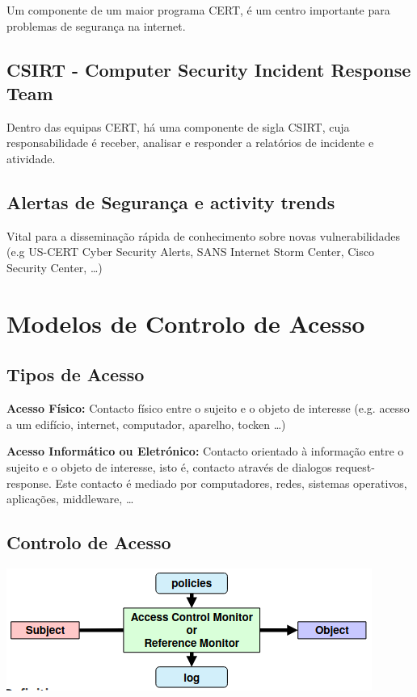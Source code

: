 \documentclass{article}
\begin{document}
Um componente de um maior programa CERT, é um centro importante
para problemas de segurança na internet.

\subsection{CSIRT - Computer Security Incident Response Team}

Dentro das equipas CERT, há uma componente de sigla CSIRT, cuja responsabilidade é
receber, analisar e responder a relatórios de incidente e atividade.

\subsection{Alertas de Segurança e activity trends}

Vital para a disseminação rápida de conhecimento sobre novas vulnerabilidades
(e.g US-CERT Cyber Security Alerts, SANS Internet Storm Center, Cisco Security Center, \dots)

\pagebreak

\section{Modelos de Controlo de Acesso}

\subsection{Tipos de Acesso}

\begin{flushleft}
  \textbf{Acesso Físico:} Contacto físico entre o sujeito e o objeto de interesse
  (e.g. acesso a um edifício, internet, computador, aparelho, tocken \dots)

  \textbf{Acesso Informático ou Eletrónico:} Contacto orientado à informação entre
  o sujeito e o objeto de interesse, isto é, contacto através de dialogos
  request-response. Este contacto é mediado por computadores, redes,
  sistemas operativos, aplicações, middleware, \dots
\end{flushleft}

\subsection{Controlo de Acesso}

\begin{center}
  \includegraphics[scale=0.4]{13}
\end{center}
\end{document}
